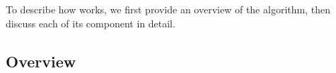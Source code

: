 

To describe how \minesp works, we first provide an overview of the algorithm, then discuss each of its component in detail.


\subsection{Overview}

